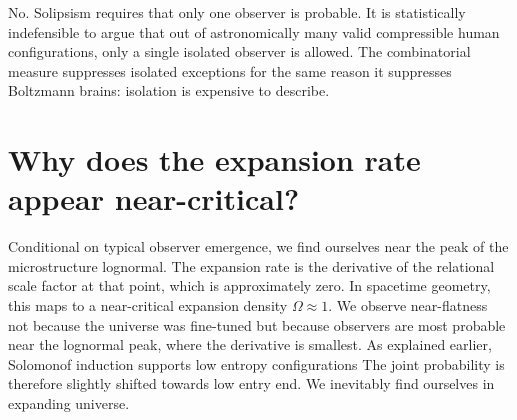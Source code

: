 No. Solipsism requires that only one observer is probable. It is statistically
indefensible to argue that out of astronomically many valid compressible
human configurations, only a single isolated observer is allowed. The
combinatorial measure suppresses isolated exceptions for the same reason
it suppresses Boltzmann brains: isolation is expensive to describe.

\section{Why does the expansion rate appear near-critical?}

Conditional on typical observer emergence, we find ourselves near the
peak of the microstructure lognormal. The expansion rate is the
derivative of the relational scale factor at that point, which is
approximately zero. In spacetime geometry, this maps to a near-critical
expansion density $\Omega \approx 1$. We observe near-flatness not
because the universe was fine-tuned but because observers are most
probable near the lognormal peak, where the derivative is smallest.
As explained earlier, Solomonof induction supports low entropy configurations
The joint probability is therefore slightly shifted towards low entry end.
We inevitably find ourselves in expanding universe.
